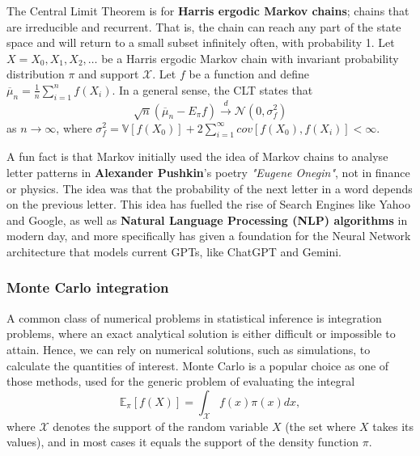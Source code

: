 The Central Limit Theorem is for \textbf{Harris ergodic Markov chains}; chains that are irreducible and recurrent. That is, the chain can reach any part of the state space and will return to a small subset infinitely often, with probability 1. Let $X=X_0,X_1,X_2,\ldots$ be a Harris ergodic Markov chain with invariant probability distribution $\pi$ and support $\mathcal{X}$. Let $f$ be a function and define $\overline{\mu}_n = \frac{1}{n} \sum_{i=1}^n f(X_i)$. In a general sense, the CLT states that
\begin{equation*}
    \sqrt{n}(\overline{\mu}_n-E_\pi f) \xrightarrow{d} \mathcal{N}(0, \sigma_f^2)
\end{equation*}
as $n \rightarrow \infty$, where $\sigma^2_f = \mathbb{V}\left[f(X_0)\right] + 2 \sum_{i=1}^{\infty}cov\left[f(X_0),f(X_i)\right] < \infty$.

A fun fact is that Markov initially used the idea of Markov chains to analyse letter patterns in \textbf{Alexander Pushkin}'s poetry \textit{"Eugene Onegin"}, not in finance or physics. The idea was that the probability of the next letter in a word depends on the previous letter. This idea has fuelled the rise of Search Engines like Yahoo and Google, as well as \textbf{Natural Language Processing (NLP) algorithms} in modern day, and more specifically has given a foundation for the Neural Network architecture that models current GPTs, like ChatGPT and Gemini.


\vspace{-1em}

\subsubsection{Monte Carlo integration}

A common class of numerical problems in statistical inference is integration problems, where an exact analytical solution is either difficult or impossible to attain. Hence, we can rely on numerical solutions, such as simulations, to calculate the quantities of interest. Monte Carlo is a popular choice as one of those methods, used for the generic problem of evaluating the integral
\begin{equation}
\label{eq:mcintegral}
    \mathbb{E}_\pi[f(X)] = \int_\mathcal{X} f(x)\pi(x)dx,
\end{equation} 
where $\mathcal{X}$ denotes the support of the random variable $X$ (the set where $X$ takes its values), and in most cases it equals the support of the density function $\pi$.


